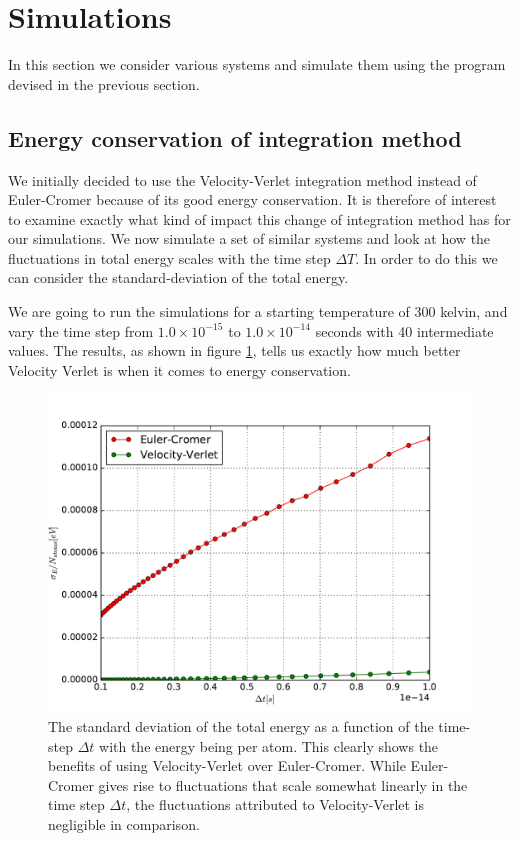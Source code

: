 \documentclass[a4paper]{article}
\begin{document}
\section{Simulations}
\label{sec:simulations}

In this section we consider various systems and simulate them using the program
devised in the previous section.

    \subsection{Energy conservation of integration method}
    \label{sub:energy_conservation_of_integration_method}

    We initially decided to use the Velocity-Verlet integration method instead of
    Euler-Cromer because of its good energy conservation. It is therefore of
    interest to examine exactly what kind of impact this change of integration
    method has for our simulations.  We now simulate a set of similar systems and
    look at how the fluctuations in total energy scales with the time step $\Delta
    T$. In order to do this we can consider the standard-deviation of the total
    energy. 

    We are going to run the simulations for a starting temperature of 300 kelvin,
    and vary the time step from $1.0 \times 10^{-15}$ to $1.0 \times 10^{-14}$
    seconds with 40 intermediate values. The results, as shown in figure
    \ref{fig:energy_fluctuations}, tells us exactly how much better Velocity Verlet
    is when it comes to energy conservation.

    \begin{figure}[h]
        \centering \includegraphics[width=0.8\linewidth]{energy_fluctuations.pdf}
        \caption[Energy fluctuations]{The standard deviation of the total energy as
            a function of the time-step $\Delta t$ with the energy being per atom.
            This clearly shows the benefits of using Velocity-Verlet over
        Euler-Cromer. While Euler-Cromer gives rise to fluctuations that scale
    somewhat linearly in the time step $\Delta t$, the fluctuations attributed to
    Velocity-Verlet is negligible in comparison.}
        \label{fig:energy_fluctuations}
    \end{figure}
\end{document}
